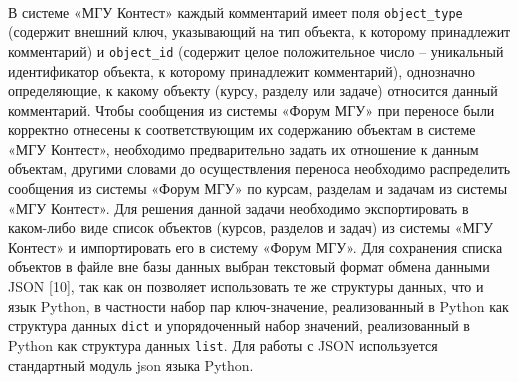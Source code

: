 \documentclass[12pt, a4paper, oneside]{article}
\begin{document}
\paragraph{}
В системе «МГУ Контест» каждый комментарий имеет поля \texttt{object\_type} (содержит внешний ключ, указывающий на тип объекта, к которому принадлежит комментарий) и \texttt{object\_id} (содержит целое положительное число – уникальный идентификатор объекта, к которому принадлежит комментарий), однозначно определяющие, к какому объекту (курсу, разделу или задаче) относится данный комментарий. Чтобы сообщения из системы «Форум МГУ» при переносе были корректно отнесены к соответствующим их содержанию объектам в системе «МГУ Контест», необходимо предварительно задать их отношение к данным объектам, другими словами до осуществления переноса необходимо распределить сообщения из системы «Форум МГУ» по курсам, разделам и задачам из системы «МГУ Контест». Для решения данной задачи необходимо экспортировать в каком-либо виде список объектов (курсов, разделов и задач) из системы «МГУ Контест» и импортировать его в систему «Форум МГУ». Для сохранения списка объектов в файле вне базы данных выбран текстовый формат обмена данными JSON [10], так как он позволяет использовать те же структуры данных, что и язык Python, в частности набор пар ключ-значение, реализованный в Python как структура данных \texttt{dict} и упорядоченный набор значений, реализованный в Python как структура данных \texttt{list}. Для работы с JSON используется стандартный модуль json языка Python.
\end{document}
